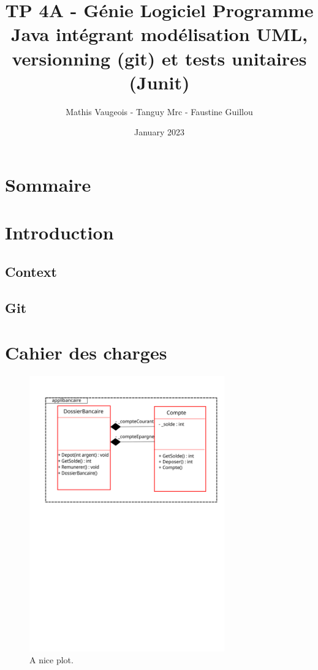 \documentclass{article}
\title{TP 4A - Génie Logiciel
Programme Java intégrant modélisation UML, versionning (git)
et tests unitaires (Junit)
}
\author{Mathis Vaugeois - Tanguy Mrc - Faustine Guillou}
\date{January 2023}
\begin{document}
\maketitle

\section*{Sommaire}

\section{Introduction}

\subsection{Context}

\subsection{Git}

\section{Cahier des charges}

\begin{figure}
    \centering
    \includegraphics[width=0.75\textwidth]{diagrammeClasse}
    \caption{A nice plot.}
    \label{fig:mesh1}
\end{figure}
\end{document}
